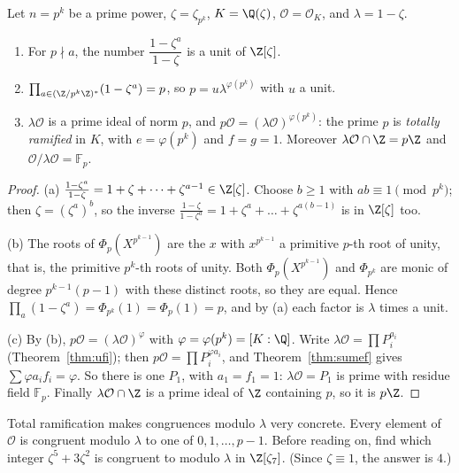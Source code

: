 \begin{proposition}\label{prop:lambda}
Let $n=p^k$ be a prime power, $\zeta=\zeta_{p^k}$, $K=\Q(\zeta)$, $\mathcal O=\mathcal O_K$, and $\lambda=1-\zeta$.
\begin{enumerate}[label=(\alph*)]
\item For $p\nmid a$, the number $\dfrac{1-\zeta^a}{1-\zeta}$ is a unit of $\Z[\zeta]$.
\item $\prod_{a\in(\Z/p^k\Z)^*}(1-\zeta^a)=p$, so $p=u\lambda^{\varphi(p^k)}$ with $u$ a unit.
\item $\lambda\mathcal O$ is a prime ideal of norm $p$, and $p\mathcal O=(\lambda\mathcal O)^{\varphi(p^k)}$: the prime $p$ is
\emph{totally ramified} in $K$, with $e=\varphi(p^k)$ and $f=g=1$. Moreover $\lambda\mathcal O\cap\Z=p\Z$ and $\mathcal
O/\lambda\mathcal O=\mathbb F_p$.
\end{enumerate}
\end{proposition}
\begin{proof}
(a) $\frac{1-\zeta^a}{1-\zeta}=1+\zeta+\dots+\zeta^{a-1}\in\Z[\zeta]$. Choose $b\ge1$ with $ab\equiv1\pmod{p^k}$; then
$\zeta=(\zeta^a)^b$, so the inverse $\frac{1-\zeta}{1-\zeta^a}=1+\zeta^a+\dots+\zeta^{a(b-1)}$ is in $\Z[\zeta]$ too.

(b) The roots of $\Phi_p(X^{p^{k-1}})$ are the $x$ with $x^{p^{k-1}}$ a primitive $p$-th root of unity, that is, the primitive
$p^k$-th roots of unity. Both $\Phi_p(X^{p^{k-1}})$ and $\Phi_{p^k}$ are monic of degree $p^{k-1}(p-1)$ with these distinct
roots, so they are equal. Hence $\prod_a(1-\zeta^a)=\Phi_{p^k}(1)=\Phi_p(1)=p$, and by (a) each factor is $\lambda$ times a
unit.

(c) By (b), $p\mathcal O=(\lambda\mathcal O)^{\varphi}$ with $\varphi=\varphi(p^k)=[K:\Q]$. Write $\lambda\mathcal O=\prod
P_i^{a_i}$ (Theorem~\ref{thm:ufi}); then $p\mathcal O=\prod P_i^{\varphi a_i}$, and Theorem~\ref{thm:sumef} gives $\sum
\varphi a_if_i=\varphi$. So there is one $P_1$, with $a_1=f_1=1$: $\lambda\mathcal O=P_1$ is prime with residue field
$\mathbb F_p$. Finally $\lambda\mathcal O\cap\Z$ is a prime ideal of $\Z$ containing $p$, so it is $p\Z$.
\end{proof}

\begin{think}
Total ramification makes congruences modulo $\lambda$ very concrete. Every element of $\mathcal O$ is congruent modulo
$\lambda$ to one of $0,1,\dots,p-1$. Before reading on, find which integer $\zeta^5+3\zeta^2$ is congruent to modulo
$\lambda$ in $\Z[\zeta_7]$. (Since $\zeta\equiv1$, the answer is $4$.)
\end{think}

